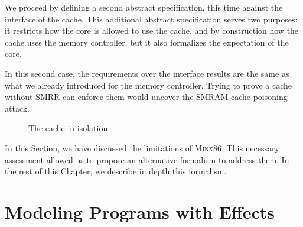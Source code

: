 \begin{example}
  We proceed by defining a second abstract specification, this time against the
  interface of the cache.
  This additional abstract specification serves two purposes: it restricts how
  the core is allowed to use the cache, and by construction how the cache uses
  the memory controller, but it also formalizes the expectation of the core.

  In this second case, the requirements over the interface results are the same
  as what we already introduced for the memory controller.
  Trying to prove a cache without SMRR can enforce them would uncover the SMRAM
  cache poisoning attack.
\end{example}

\begin{figure}
  \centering

  \caption{The cache in isolation}
  \label{fig:freespec:cachec}
\end{figure}

In this Section, we have discussed the limitations of {\scshape Minx86}.
%
This necessary assessment allowed us to propose an alternative formalism to
address them.
%
In the rest of this Chapter, we describe in depth this formalism.

\section{Modeling Programs with Effects}
\label{sec:freespec:specifying}

